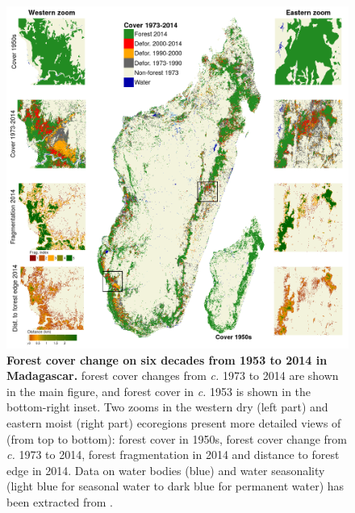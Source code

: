 \documentclass[a4paper, 12pt, leqno]{article}\usepackage[]{graphicx}\usepackage[]{color}
\begin{document}
\newpage

\begin{figure}[h!]
  \centering
  
  \includegraphics[width=16cm]{figs/fig_fcc.png}

  \caption{\textbf{Forest cover change on six decades from 1953 to
      2014 in Madagascar.} forest cover changes from \emph{c.} 1973 to
    2014 are shown in the main figure, and forest cover in \emph{c.}
    1953 is shown in the bottom-right inset. Two zooms in the western
    dry (left part) and eastern moist (right part) ecoregions present
    more detailed views of (from top to bottom): forest cover in
    1950s, forest cover change from \emph{c.} 1973 to 2014, forest
    fragmentation in 2014 and distance to forest edge in 2014. Data on
    water bodies (blue) and water seasonality (light blue for seasonal
    water to dark blue for permanent water) has been extracted from
    \citet{Pekel2016}.}

  \label{fig:fcc}

\end{figure}

\newpage
\end{document}
